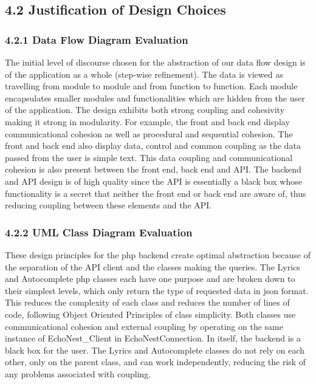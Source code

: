 \documentclass[]{article}
\begin{document}
\subsection{4.2 Justification of Design
Choices}\label{justification-of-design-choices}

\subsubsection{4.2.1 Data Flow Diagram
Evaluation}\label{data-flow-diagram-evaluation}

The initial level of discourse chosen for the abstraction of our data
flow design is of the application as a whole (step-wise refinement). The
data is viewed as travelling from module to module and from function to
function. Each module encapsulates smaller modules and functionalities
which are hidden from the user of the application. The design exhibits
both strong coupling and cohesivity making it strong in modularity. For
example, the front and back end display communicational cohesion as well
as procedural and sequential cohesion. The front and back end also
display data, control and common coupling as the data passed from the
user is simple text. This data coupling and communicational cohesion is
also present between the front end, back end and API. The backend and
API design is of high quality since the API is essentially a black box
whose functionality is a secret that neither the front end or back end
are aware of, thus reducing coupling between these elements and the API.

\subsubsection{4.2.2 UML Class Diagram
Evaluation}\label{uml-class-diagram-evaluation}

These design principles for the php backend create optimal abstraction
because of the separation of the API client and the classes making the
queries. The Lyrics and Autocomplete php classes each have one purpose
and are broken down to their simplest levels, which only return the type
of requested data in json format. This reduces the complexity of each
class and reduces the number of lines of code, following Object Oriented
Principles of class simplicity. Both classes use communicational
cohesion and external coupling by operating on the same instance of
EchoNest\_Client in EchoNestConnection. In itself, the backend is a
black box for the user. The Lyrics and Autocomplete classes do not rely
on each other, only on the parent class, and can work independently,
reducing the risk of any problems associated with coupling.
\end{document}
